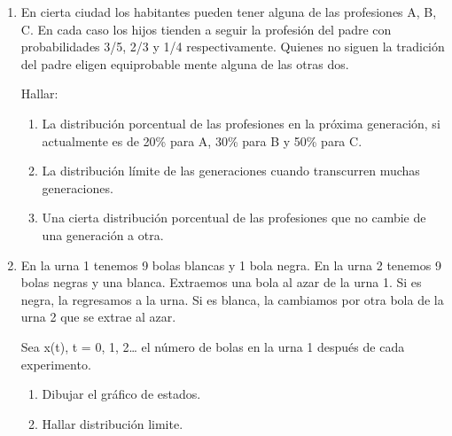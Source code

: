 \documentclass{templateNote}
\begin{document}
\begin{enumerate}[resume, start=10]

    \newpage
    \item En cierta ciudad los habitantes pueden tener alguna de las profesiones A, B, C. En cada
    caso los hijos tienden a seguir la profesión del padre con probabilidades 3/5, 2/3 y 1/4
    respectivamente. Quienes no siguen la tradición del padre eligen equiprobable mente
    alguna de las otras dos.

    Hallar:

    \begin{enumerate}[label=\alph*)]
        \item La distribución porcentual de las profesiones en la próxima generación, si actualmente es de 20\% para A, 30\% para B y 50\% para C.
        \item La distribución límite de las generaciones cuando transcurren muchas generaciones. 
        \item Una cierta distribución porcentual de las profesiones que no cambie de una generación a otra.
    \end{enumerate}


    \newpage
    \item En la urna 1 tenemos 9 bolas blancas y 1 bola negra. En la urna 2 tenemos 9 bolas
    negras y una blanca. Extraemos una bola al azar de la urna 1. Si es negra, la regresamos a
    la urna. Si es blanca, la cambiamos por otra bola de la urna 2 que se extrae al azar. 

    Sea x(t), t = 0, 1, 2… el número de bolas en la urna 1 después de cada experimento. 

    \begin{enumerate}[label=\alph*)]
        \item Dibujar el gráfico de estados.
        \item Hallar distribución limite.
    \end{enumerate}

\end{enumerate}
\end{document}
